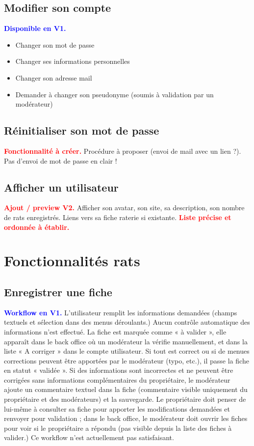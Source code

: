 \documentclass[a4paper,10pt]{article}
\newcommand\existant[1]{\noindent\textbf{\textcolor{blue}{#1}}}
\newcommand\desire[1]{\noindent\textbf{\textcolor{red}{#1}}}
\begin{document}
\subsection{Modifier son compte}

\existant{Disponible en V1.}
\begin{itemize}
\item Changer son mot de passe
\item Changer ses informations personnelles 
\item Changer son adresse mail
\item Demander à changer son pseudonyme (soumis à validation par un modérateur)
\end{itemize}

\subsection{Réinitialiser son mot de passe}
\desire{Fonctionnalité à créer.} Procédure à proposer (envoi de mail avec un lien ?). Pas d'envoi de mot de passe en clair !

\subsection{Afficher un utilisateur}

\desire{Ajout / preview V2.} Afficher son avatar, son site, sa description, son nombre de rats enregistrés. Liens vers sa fiche raterie si existante. \desire{Liste précise et ordonnée à établir.}

\section{Fonctionnalités rats}

\subsection{Enregistrer une fiche}

\existant{Workflow en V1.} L'utilisateur remplit les informations demandées (champs textuels et sélection dans des menus déroulants.) Aucun contrôle automatique des informations n'est effectué. La fiche est marquée comme « à valider », elle apparaît dans le back office où un modérateur la vérifie manuellement, et dans la liste « A corriger » dans le compte utilisateur. Si tout est correct ou si de menues corrections peuvent être apportées par le modérateur (typo, etc.), il passe la fiche en statut « validée ». Si des informations sont incorrectes et ne peuvent être corrigées sans informations complémentaires du propriétaire, le modérateur ajoute un commentaire textuel dans la fiche (commentaire visible uniquement du propriétaire et des modérateurs) et la sauvegarde. Le propriétaire doit penser de lui-même à consulter sa fiche pour apporter les modifications demandées et renvoyer pour validation ; dans le back office, le modérateur doit ouvrir les fiches pour voir si le propriétaire a répondu (pas visible depuis la liste des fiches à valider.) Ce workflow n'est actuellement pas satisfaisant.
\end{document}
